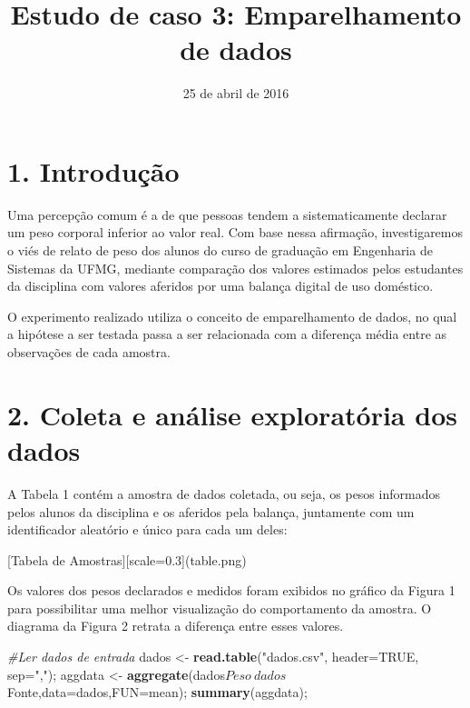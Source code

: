 \documentclass[]{article}
\title{Estudo de caso 3: Emparelhamento de dados}
\author{}
\date{25 de abril de 2016}
\newenvironment{Shaded}{\begin{snugshade}}{\end{snugshade}}
\newcommand{\KeywordTok}[1]{\textcolor[rgb]{0.13,0.29,0.53}{\textbf{{#1}}}}
\newcommand{\DataTypeTok}[1]{\textcolor[rgb]{0.13,0.29,0.53}{{#1}}}
\newcommand{\StringTok}[1]{\textcolor[rgb]{0.31,0.60,0.02}{{#1}}}
\newcommand{\CommentTok}[1]{\textcolor[rgb]{0.56,0.35,0.01}{\textit{{#1}}}}
\newcommand{\OtherTok}[1]{\textcolor[rgb]{0.56,0.35,0.01}{{#1}}}
\newcommand{\NormalTok}[1]{{#1}}
\begin{document}
\maketitle


\section{1. Introdução}\label{introducao}

\quad Uma percepção comum é a de que pessoas tendem a sistematicamente
declarar um peso corporal inferior ao valor real. Com base nessa
afirmação, investigaremos o viés de relato de peso dos alunos do curso
de graduação em Engenharia de Sistemas da UFMG, mediante comparação dos
valores estimados pelos estudantes da disciplina com valores aferidos
por uma balança digital de uso doméstico.

\quad O experimento realizado utiliza o conceito de emparelhamento de
dados, no qual a hipótese a ser testada passa a ser relacionada com a
diferença média entre as observações de cada amostra.

\section{2. Coleta e análise exploratória dos
dados}\label{coleta-e-analise-exploratoria-dos-dados}

\quad A Tabela 1 contém a amostra de dados coletada, ou seja, os pesos
informados pelos alunos da disciplina e os aferidos pela balança,
juntamente com um identificador aleatório e único para cada um deles:

{[}Tabela de Amostras{]}{[}scale=0.3{]}(table.png)

\quad Os valores dos pesos declarados e medidos foram exibidos no
gráfico da Figura 1 para possibilitar uma melhor visualização do
comportamento da amostra. O diagrama da Figura 2 retrata a diferença
entre esses valores.

\begin{Shaded}
\begin{Highlighting}[]
\CommentTok{#Ler dados de entrada}
\NormalTok{dados <-}\StringTok{ }\KeywordTok{read.table}\NormalTok{(}\StringTok{"dados.csv"}\NormalTok{, }\DataTypeTok{header=}\OtherTok{TRUE}\NormalTok{, }\DataTypeTok{sep=}\StringTok{","}\NormalTok{);}
\NormalTok{aggdata <-}\StringTok{ }\KeywordTok{aggregate}\NormalTok{(dados$Peso~dados$Fonte,}\DataTypeTok{data=}\NormalTok{dados,}\DataTypeTok{FUN=}\NormalTok{mean);}
\KeywordTok{summary}\NormalTok{(aggdata);}
\end{Highlighting}
\end{Shaded}
\end{document}
